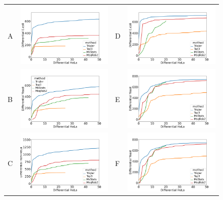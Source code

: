 \documentclass[11pt]{article}
\begin{document}
\begin{figure}[hbt]
    \centering
    \begin{tabular}{lclc} 
        A & \includegraphics[width=0.4\linewidth]{../../result/report_plots_pipeline/diff_HeLa_vs_nonHeLa_ID_ecoli_0.51.png} & 
        D & \includegraphics[width=0.4\linewidth]{../../result/report_plots_pipeline/diff_HeLa_vs_nonHeLa_PS_ecoli_0.51.png} \\ 
        B & \includegraphics[width=0.4\linewidth]{../../result/report_plots_pipeline/diff_HeLa_vs_nonHeLa_ID_yeast_0.51.png} & 
        E & \includegraphics[width=0.4\linewidth]{../../result/report_plots_pipeline/diff_HeLa_vs_nonHeLa_PS_yeast_0.51.png} \\
        C & \includegraphics[width=0.4\linewidth]{../../result/report_plots_pipeline/diff_HeLa_vs_nonHeLa_ID_all_0.51.png} & 
        F & \includegraphics[width=0.4\linewidth]{../../result/report_plots_pipeline/diff_HeLa_vs_nonHeLa_PS_yeast_0.51.png} \\ 


\end{tabular}
\end{figure}
\end{document}
